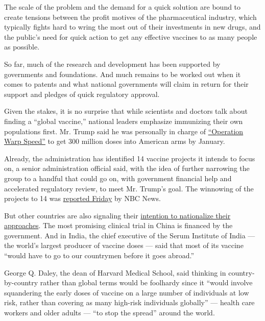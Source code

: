 The scale of the problem and the demand for a quick solution are bound
to create tensions between the profit motives of the pharmaceutical
industry, which typically fights hard to wring the most out of their
investments in new drugs, and the public's need for quick action to get
any effective vaccines to as many people as possible.

So far, much of the research and development has been supported by
governments and foundations. And much remains to be worked out when it
comes to patents and what national governments will claim in return for
their support and pledges of quick regulatory approval.

Given the stakes, it is no surprise that while scientists and doctors
talk about finding a ``global vaccine,'' national leaders emphasize
immunizing their own populations first. Mr. Trump said he was personally
in charge of
\href{https://www.nytimes3xbfgragh.onion/2020/04/29/us/politics/trump-coronavirus-vaccine-operation-warp-speed.html}{``Operation
Warp Speed''} to get 300 million doses into American arms by January.

Already, the administration has identified 14 vaccine projects it
intends to focus on, a senior administration official said, with the
idea of further narrowing the group to a handful that could go on, with
government financial help and accelerated regulatory review, to meet Mr.
Trump's goal. The winnowing of the projects to 14 was
\href{https://www.nbcnews.com/politics/white-house/health-officials-eyeing-least-one-14-potential-coronavirus-vaccines-fast-n1198326}{reported
Friday} by NBC News.

But other countries are also signaling their
\href{https://www.nytimes3xbfgragh.onion/2020/04/10/business/coronavirus-vaccine-nationalism.html}{intention
to nationalize their approaches}. The most promising clinical trial in
China is financed by the government. And in India, the chief executive
of the Serum Institute of India --- the world's largest producer of
vaccine doses --- said that most of its vaccine ``would have to go to
our countrymen before it goes abroad.''

George Q. Daley, the dean of Harvard Medical School, said thinking in
country-by-country rather than global terms would be foolhardy since it
``would involve squandering the early doses of vaccine on a large number
of individuals at low risk, rather than covering as many high-risk
individuals globally'' --- health care workers and older adults --- ``to
stop the spread'' around the world.

